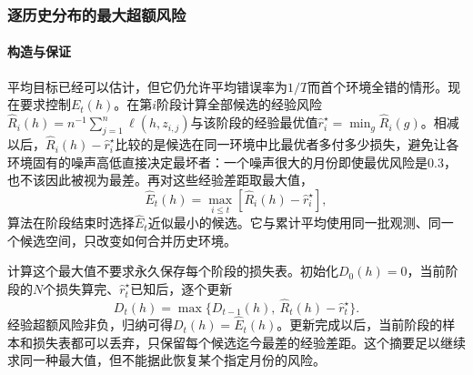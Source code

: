 \subsubsection{逐历史分布的最大超额风险}

\paragraph{构造与保证}
平均目标已经可以估计，但它仍允许平均错误率为$1/T$而首个环境全错的情形。现在要求控制$E_t(h)$。在第$i$阶段计算全部候选的经验风险$\widehat R_i(h)=n^{-1}\sum_{j=1}^n\ell(h,z_{i,j})$与该阶段的经验最优值$\widehat r_i^\star=\min_g\widehat R_i(g)$。相减以后，$\widehat R_i(h)-\widehat r_i^\star$比较的是候选在同一环境中比最优者多付多少损失，避免让各环境固有的噪声高低直接决定最坏者：一个噪声很大的月份即使最优风险是0.3，也不该因此被视为最差。再对这些经验差距取最大值，
\[
 \widehat E_t(h)=\max_{i\leq t}[\widehat R_i(h)-\widehat r_i^\star],
\]
算法在阶段结束时选择$\widehat E_t$近似最小的候选。它与累计平均使用同一批观测、同一个候选空间，只改变如何合并历史环境。

计算这个最大值不要求永久保存每个阶段的损失表。初始化$D_0(h)=0$，当前阶段的$N$个损失算完、$\widehat r_t^\star$已知后，逐个更新
\[
 D_t(h)=\max\{D_{t-1}(h),\ \widehat R_t(h)-\widehat r_t^\star\}.
\]
经验超额风险非负，归纳可得$D_t(h)=\widehat E_t(h)$。更新完成以后，当前阶段的样本和损失表都可以丢弃，只保留每个候选迄今最差的经验差距。这个摘要足以继续求同一种最大值，但不能据此恢复某个指定月份的风险。

